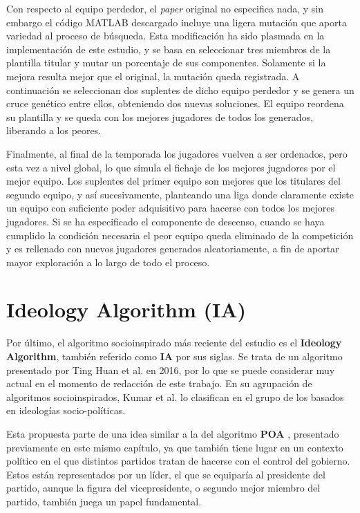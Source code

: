 Con respecto al equipo perdedor, el \textit{paper} original no especifica nada, y sin embargo el código MATLAB descargado \cite{slc-matlab} incluye una ligera mutación que aporta variedad al proceso de búsqueda. Esta modificación ha sido plasmada en la implementación de este estudio, y se basa en seleccionar tres miembros de la plantilla titular y mutar un porcentaje de sus componentes. Solamente si la mejora resulta mejor que el original, la mutación queda registrada. A continuación se seleccionan dos suplentes de dicho equipo perdedor y se genera un cruce genético entre ellos, obteniendo dos nuevas soluciones. El equipo reordena su plantilla y se queda con los mejores jugadores de todos los generados, liberando a los peores.

Finalmente, al final de la temporada los jugadores vuelven a ser ordenados, pero esta vez a nivel global, lo que simula el fichaje de los mejores jugadores por el mejor equipo. Los suplentes del primer equipo son mejores que los titulares del segundo equipo, y así sucesivamente, planteando una liga donde claramente existe un equipo con suficiente poder adquisitivo para hacerse con todos los mejores jugadores. Si se ha especificado el componente de descenso, cuando se haya cumplido la condición necesaria el peor equipo queda eliminado de la competición y es rellenado con nuevos jugadores generados aleatoriamente, a fin de aportar mayor exploración a lo largo de todo el proceso.

\section{Ideology Algorithm (IA)}

Por último, el algoritmo socioinspirado más reciente del estudio es el \textbf{Ideology Algorithm}, también referido como \textbf{IA} por sus siglas. Se trata de un algoritmo presentado por Ting Huan et al. \cite{ia-article} en 2016, por lo que se puede considerar muy actual en el momento de redacción de este trabajo. En su agrupación de algoritmos socioinspirados, Kumar et al. \cite{socio-evolution-algorithm} lo clasifican en el grupo de los basados en ideologías socio-políticas.

Esta propuesta parte de una idea similar a la del algoritmo \textbf{POA} \cite{poa-article}, presentado previamente en este mismo capítulo, ya que también tiene lugar en un contexto político en el que distintos partidos tratan de hacerse con el control del gobierno. Estos están representados por un líder, el que se equiparía al presidente del partido, aunque la figura del vicepresidente, o segundo mejor miembro del partido, también juega un papel fundamental.

